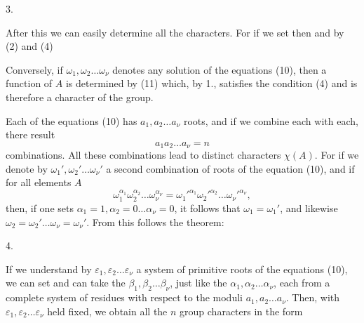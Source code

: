 
3. 

After this we can easily determine all the characters. For if we set
then
and by (2) and (4)

Conversely, if $\omega_1, \omega_2 \ldots \omega_\nu$ denotes any solution of the equations (10), then a function of $A$ is determined by (11) which, by 1., satisfies the condition (4) and is therefore a character of the group.

Each of the equations (10) has $a_1, a_2 \ldots a_\nu$ roots, and if we combine each with each, there result
\[
a_1 a_2 \ldots a_\nu = n
\]
combinations. All these combinations lead to distinct characters $\chi(A)$. For if we denote by $\omega_1', \omega_2' \ldots \omega_\nu'$ a second combination of roots of the equation (10), and if for all elements $A$
\[
\omega_1^{\alpha_1}\omega_2^{\alpha_2}\ldots\omega_\nu^{\alpha_\nu} = \omega_1'^{\alpha_1}\omega_2'^{\alpha_2}\ldots\omega_\nu'^{\alpha_\nu},
\]
then, if one sets $\alpha_1 = 1, \alpha_2 = 0 \ldots \alpha_\nu = 0$, it follows that $\omega_1 = \omega_1'$, and likewise $\omega_2 = \omega_2' \ldots \omega_\nu = \omega_\nu'$. From this follows the theorem:

4. 

If we understand by $\varepsilon_1, \varepsilon_2 \ldots \varepsilon_\nu$ a system of primitive roots of the equations (10), we can set
and can take the $\beta_1, \beta_2 \ldots \beta_\nu$, just like the $\alpha_1, \alpha_2 \ldots \alpha_\nu$, each from a complete system of residues with respect to the moduli $a_1, a_2 \ldots a_\nu$. Then, with $\varepsilon_1, \varepsilon_2 \ldots \varepsilon_\nu$ held fixed, we obtain all the $n$ group characters in the form
